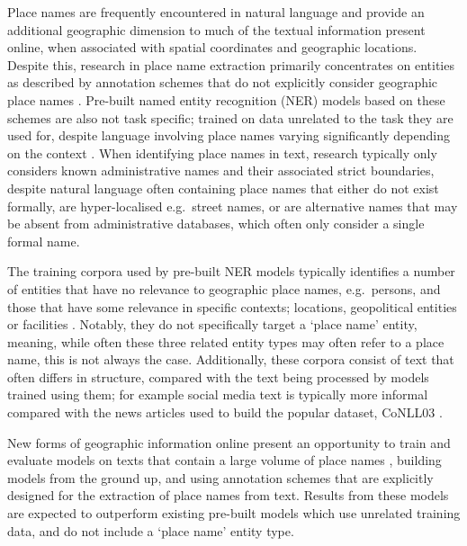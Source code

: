 \documentclass[]{interact}
\theoremstyle{plain}%
\theoremstyle{definition}
\theoremstyle{remark}
\begin{document}
Place names are frequently encountered in natural language and provide
an additional geographic dimension to much of the textual information
present online, when associated with spatial coordinates and geographic
locations. Despite this, research in place name extraction primarily
concentrates on entities as described by annotation schemes that do not
explicitly consider geographic place names
\citep{karimzadeh2019, halterman2017, hu2019}. Pre-built named entity
recognition (NER) models based on these schemes are also not task
specific; trained on data unrelated to the task they are used for,
despite language involving place names varying significantly depending
on the context \citep{purves2018}. When identifying place names in text,
research typically only considers known administrative names and their
associated strict boundaries, despite natural language often containing
place names that either do not exist formally, are hyper-localised
e.g.~street names, or are alternative names that may be absent from
administrative databases, which often only consider a single formal
name.

The training corpora used by pre-built NER models typically identifies a
number of entities that have no relevance to geographic place names,
e.g.~persons, and those that have some relevance in specific contexts;
locations, geopolitical entities or facilities
\citep{weischedelralph2013, tjongkimsang2003}. Notably, they do not
specifically target a `place name' entity, meaning, while often these
three related entity types may often refer to a place name, this is not
always the case. Additionally, these corpora consist of text that often
differs in structure, compared with the text being processed by models
trained using them; for example social media text is typically more
informal compared with the news articles used to build the popular
dataset, CoNLL03 \citep{tjongkimsang2003}.

New forms of geographic information online present an opportunity to
train and evaluate models on texts that contain a large volume of place
names \citep{goodchild2011}, building models from the ground up, and
using annotation schemes that are explicitly designed for the extraction
of place names from text. Results from these models are expected to
outperform existing pre-built models which use unrelated training data,
and do not include a `place name' entity type.
\end{document}

